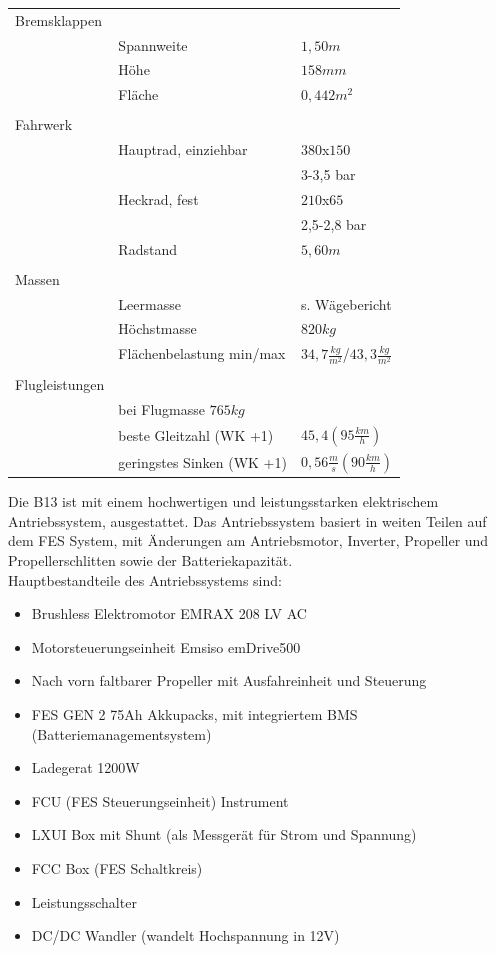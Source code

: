 \begin{longtable}{l l l}
 Bremsklappen & & \\
 & Spannweite & $1,50m$\\
 & Höhe & $158mm$ \\
 & Fläche & $0,442m^2$\\
 & & \\
 Fahrwerk & & \\
 & Hauptrad, einziehbar & $380$x$150$\\ 
 & & 3-3,5 bar\\
 & Heckrad, fest & $210$x$65$ \\ 
 & & 2,5-2,8 bar\\
 & Radstand & $5,60m$\\
 & & \\
 Massen & & \\
 & Leermasse & s. Wägebericht\\
 & Höchstmasse & $820kg$\\
 & Flächenbelastung min/max & $34,7\frac{kg}{m^2}$/$43,3\frac{kg}{m^2}$\\
 & & \\
 Flugleistungen & & \\
 & bei Flugmasse $765kg$ & \\
 & beste Gleitzahl (WK +1) & $45,4 (95\frac{km}{h})$ \\
 & geringstes Sinken (WK +1) & $0,56\frac{m}{s} (90\frac{km}{h})$

\end{longtable}
\newpage
Die B13 ist mit einem hochwertigen und leistungsstarken elektrischem Antriebssystem, ausgestattet. Das Antriebssystem basiert in weiten Teilen auf dem FES System, mit Änderungen am Antriebsmotor, Inverter, Propeller und Propellerschlitten sowie der Batteriekapazität.\\

Hauptbestandteile des Antriebssystems sind:
\begin{itemize}
\item Brushless Elektromotor EMRAX 208 LV AC
\item Motorsteuerungseinheit Emsiso emDrive500
\item Nach vorn faltbarer Propeller mit Ausfahreinheit und Steuerung
\item FES GEN 2 75Ah Akkupacks, mit integriertem BMS (Batteriemanagementsystem)
\item Ladegerat 1200W
\item FCU (FES Steuerungseinheit) Instrument
\item LXUI Box mit Shunt (als Messgerät für Strom und Spannung)
\item FCC Box (FES Schaltkreis)
\item Leistungsschalter
\item DC/DC Wandler (wandelt Hochspannung in 12V)
\end{itemize}



